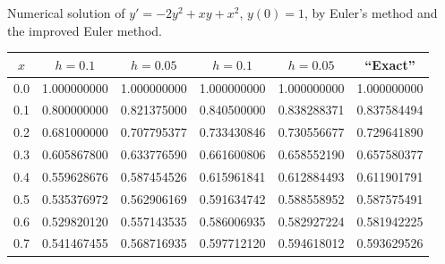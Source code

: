 \begin{examplesolution}
\begin{newtable}
  \label{table:3.2.3} Numerical solution of $y'=-2y^{2}+xy+x^{2}$, $y(0)=1$, by Euler's method and
  the improved Euler method.
  \begin{center}
    \begin{tabular}{|c|r|r|r|r|r|}
      \hline
      \multicolumn{1}{|c|}{$x$} & \multicolumn{1}{|c|}{$h=0.1$} & \multicolumn{1}{|c|}{$h=0.05$}      & \multicolumn{1}{|c|}{$h=0.1$} & \multicolumn{1}{|c|}{$h=0.05$} & \multicolumn{1}{|c|}{``Exact''} \\
      \hline
      0.0                       & 1.000000000                   & 1.000000000                         & 1.000000000                   & 1.000000000                    & 1.000000000                     \\
      0.1                       & 0.800000000                   & 0.821375000                         & 0.840500000                   & 0.838288371                    & 0.837584494                     \\
      0.2                       & 0.681000000                   & 0.707795377                         & 0.733430846                   & 0.730556677                    & 0.729641890                     \\
      0.3                       & 0.605867800                   & 0.633776590                         & 0.661600806                   & 0.658552190                    & 0.657580377                     \\
      0.4                       & 0.559628676                   & 0.587454526                         & 0.615961841                   & 0.612884493                    & 0.611901791                     \\
      0.5                       & 0.535376972                   & 0.562906169                         & 0.591634742                   & 0.588558952                    & 0.587575491                     \\
      0.6                       & 0.529820120                   & 0.557143535                         & 0.586006935                   & 0.582927224                    & 0.581942225                     \\
      0.7                       & 0.541467455                   & 0.568716935                         & 0.597712120                   & 0.594618012                    & 0.593629526                     \\

\end{tabular}
\end{center}
\end{newtable}
\end{examplesolution}
